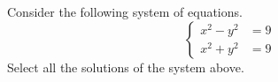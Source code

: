 \documentclass{ximera}
\author{Kenneth Berglund}
\begin{document}
\licenseSZ
\begin{exercise}
Consider the following system of equations.
$$
\begin{cases}
x^2 - y^2 & = 9 \\
x^2 + y^2 & = 9
\end{cases}
$$
Select all the solutions of the system above.
\begin{selectAll}
\end{selectAll}

\end{exercise}
\end{document}
